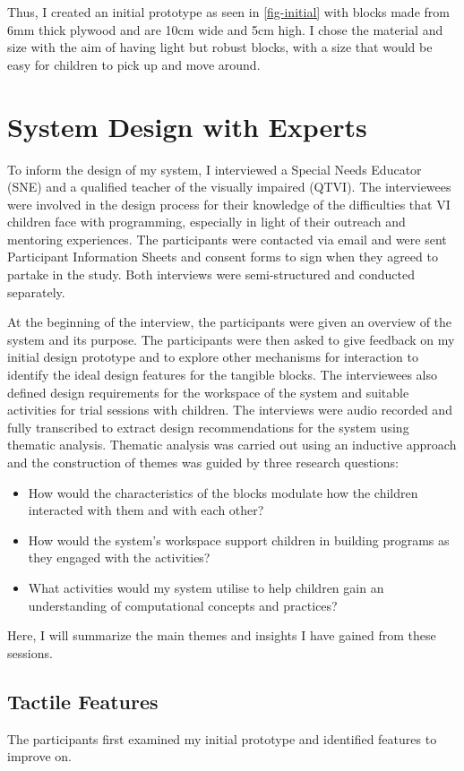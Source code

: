 \documentclass[oneside,%
                    author={Malak Hajji},
                    degree={BSc},
                    title={Designing An Accessible Ozobot Programming Platform for Students},
                  subtitle={With Mixed Visual Abilities}]{dissertation}
\begin{document}
Thus, I created an initial prototype as seen in \ref{fig-initial} with blocks made from 6mm thick plywood and are 10cm wide and 5cm high. I chose the material and size with the aim of having light but robust blocks, with a size that would be easy for children to pick up and move around.


\section{System Design with Experts}
To inform the design of my system, I interviewed a Special Needs Educator (SNE) and a qualified teacher of the visually impaired (QTVI). The interviewees were involved in the design process for their knowledge of the difficulties that VI children face with programming, especially in light of their outreach and mentoring experiences. The participants were contacted via email and were sent Participant Information Sheets and consent forms to sign when they agreed to partake in the study. Both interviews were semi-structured and conducted separately. 

At the beginning of the interview, the participants were given an overview of the system and its purpose. The participants were then asked to give feedback on my initial design prototype and to explore other mechanisms for interaction to identify the ideal design features for the tangible blocks. The interviewees also defined design requirements for the workspace of the system and suitable activities for trial sessions with children. 
The interviews were audio recorded and fully transcribed to extract design recommendations for the system using thematic analysis. Thematic analysis was carried out using an inductive approach and the construction of themes was guided by three research questions: 
\begin{itemize}
    \item How would the characteristics of the blocks modulate how the children interacted with them and with each other?
    \item How would the system's workspace support children in building programs as they engaged with the activities? 
    \item What activities would my system utilise to help children gain an understanding of computational concepts and practices?
\end{itemize}
Here, I will summarize the main themes and insights I have gained from these sessions.

\subsection{Tactile Features}
The participants first examined my initial prototype and identified features to improve on.
\end{document}
